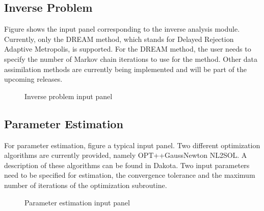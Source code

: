 \subsection{Inverse Problem}

Figure  shows the input panel corresponding to the inverse analysis module. Currently, only the DREAM method, which stands for Delayed Rejection Adaptive Metropolis, is supported. For the DREAM method, the user needs to specify the number of Markov chain iterations to use for the method. Other data assimilation methods are currently being implemented and will be part of the upcoming releases. 


\begin{figure}[!htbp]
  \caption{Inverse problem input panel}
  \label{fig:inv}
\end{figure}

\subsection{Parameter Estimation}

For parameter estimation, figure  a typical input panel. Two different optimization algorithms are currently provided, namely OPT++GaussNewton NL2SOL. A description of these algorithms can be found in Dakota. Two input parameters need to be specified for estimation, the convergence tolerance and the maximum number of iterations of the optimization subroutine. 

\begin{figure}[!htbp]
  \caption{Parameter estimation input panel}
  \label{fig:pe}
\end{figure}


